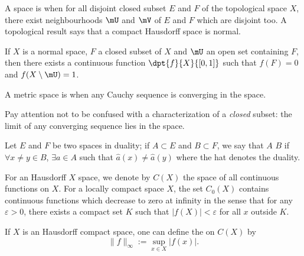 \begin{definition}
	A space is  when for all disjoint closed subset $E$ and $F$ of the topological space $X$, there exist neighbourhoods $\mU$ and $\mV$ of $E$ and $F$ which are disjoint too. A topological result says that a compact Hausdorff space is normal.
\end{definition}

\begin{lemma}\label{lem:Urysohn}
	If $X$ is a normal space, $F$ a closed subset of $X$ and $\mU$ an open set containing $F$, then there exists a continuous function $\dpt{f}{X}{[0,1]}$ such that $f(F)=0$ and $f(X\setminus\mU)=1$.
\end{lemma}

\begin{definition}
	A metric space is  when any Cauchy sequence is converging in the space.
\end{definition}

Pay attention not to be confused with a characterization of a \emph{closed} subset: the limit of any converging sequence lies in the space.

\begin{definition}\label{def:separe}
	Let $E$ and $F$ be two spaces in duality; if $A\subset E$ and $B\subset F$, we say that $A$  $B$ if $\forall x\neq y\in B$, $\exists a\in A$ such that $\hat{a}(x)\neq\hat{a}(y)$ where the hat denotes the duality.
\end{definition}

For an Hausdorff $X$ space, we denote by $C(X)$\label{pg_def_Cz } the space of all continuous functions on $X$. For a locally compact space $X$, the set $C_0(X)$ contains continuous functions which decrease to zero at infinity in the sense that for any $\varepsilon>0$, there exists a compact set $K$ such that $|f(X)|<\varepsilon$ for all $x$ outside $K$.

\begin{definition}
	If $X$ is an Hausdorff compact space, one can define the  on $C(X)$ by
	\begin{equation}
		\|f\|_{\infty}:=\sup_{x\in X}|f(x)|.
	\end{equation}
	\label{def:sup_norm}
\end{definition}

